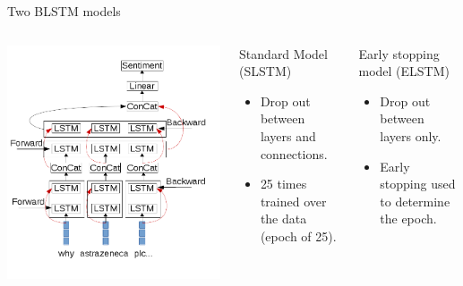\documentclass[10pt]{beamer}
\begin{document}
%
\begin{frame}[fragile]{Two BLSTM models}
\begin{columns}[T,onlytextwidth]
\includegraphics[scale=0.3]{lstm_diagram.png}


      \begin{block}{Standard Model (SLSTM)}
\begin{itemize}
\item Drop out between layers and connections.
\item 25 times trained over the data (epoch of 25).
\end{itemize}

\end{block}
\begin{block}{Early stopping model (ELSTM)}
\begin{itemize}
\item Drop out between layers only.
\item Early stopping used to determine the epoch.
\end{itemize}

\end{block}

  \end{columns}


\end{frame}
\end{document}
